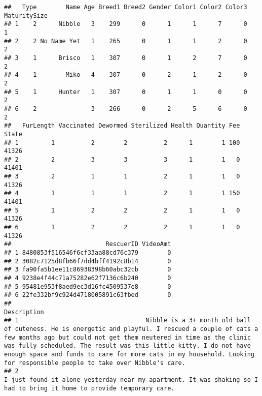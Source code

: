 \documentclass[
]{article}
\begin{document}
\begin{verbatim}
##   Type        Name Age Breed1 Breed2 Gender Color1 Color2 Color3 MaturitySize
## 1    2      Nibble   3    299      0      1      1      7      0            1
## 2    2 No Name Yet   1    265      0      1      1      2      0            2
## 3    1      Brisco   1    307      0      1      2      7      0            2
## 4    1        Miko   4    307      0      2      1      2      0            2
## 5    1      Hunter   1    307      0      1      1      0      0            2
## 6    2               3    266      0      2      5      6      0            2
##   FurLength Vaccinated Dewormed Sterilized Health Quantity Fee State
## 1         1          2        2          2      1        1 100 41326
## 2         2          3        3          3      1        1   0 41401
## 3         2          1        1          2      1        1   0 41326
## 4         1          1        1          2      1        1 150 41401
## 5         1          2        2          2      1        1   0 41326
## 6         1          2        2          2      1        1   0 41326
##                          RescuerID VideoAmt
## 1 8480853f516546f6cf33aa88cd76c379        0
## 2 3082c7125d8fb66f7dd4bff4192c8b14        0
## 3 fa90fa5b1ee11c86938398b60abc32cb        0
## 4 9238e4f44c71a75282e62f7136c6b240        0
## 5 95481e953f8aed9ec3d16fc4509537e8        0
## 6 22fe332bf9c924d4718005891c63fbed        0
##                                                                                                                                                                                                                                                                                                                                                                                                 Description
## 1                                   Nibble is a 3+ month old ball of cuteness. He is energetic and playful. I rescued a couple of cats a few months ago but could not get them neutered in time as the clinic was fully scheduled. The result was this little kitty. I do not have enough space and funds to care for more cats in my household. Looking for responsible people to take over Nibble's care.
## 2                                                                                                                                                                                                                                                                                    I just found it alone yesterday near my apartment. It was shaking so I had to bring it home to provide temporary care.

\end{verbatim}
\end{document}
